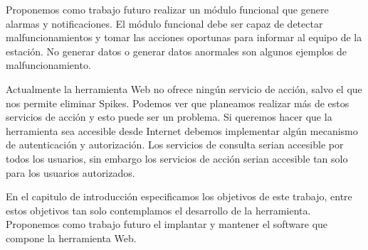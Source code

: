 \begin{description}[style=unboxed,leftmargin=0cm,labelwidth=1cm]
				Proponemos como trabajo futuro realizar un módulo funcional que genere alarmas y notificaciones. El módulo funcional
				debe ser capaz de detectar malfuncionamientos y tomar las acciones oportunas para informar al equipo de la estación.
				No generar datos o generar datos anormales son algunos ejemplos de malfuncionamiento.
			\item[Autenticación y autorización]
				Actualmente la herramienta Web no ofrece ningún servicio de acción, salvo el que nos permite eliminar Spikes. Podemos
				ver que planeamos realizar más de estos servicios de acción y esto puede ser un problema. Si queremos hacer que la
				herramienta sea accesible desde Internet debemos implementar algún mecanismo de autenticación y autorización. Los
				servicios de consulta serian accesible por todos los usuarios, sin embargo los servicios de acción serian accesible
				tan solo para los usuarios autorizados.
			\item[Implantación y Mantenimiento]
				En el capitulo de introducción especificamos los objetivos de este trabajo, entre estos objetivos tan solo
				contemplamos el desarrollo de la herramienta. Proponemos como trabajo futuro el implantar y mantener el software que
				compone la herramienta Web. 

			
		\end{description}
